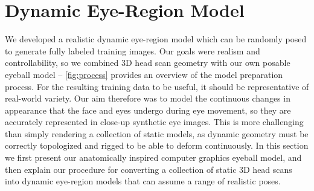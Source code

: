 


\section{Dynamic Eye-Region Model}

We developed a realistic dynamic eye-region model which can be randomly posed to generate fully labeled training images.
Our goals were realism and controllability, so we combined 3D head scan geometry with our own posable eyeball model -- \autoref{fig:process} provides an overview of the model preparation process.
For the resulting training data to be useful, it should be representative of real-world variety.
Our aim therefore was to model the continuous changes in appearance that the face and eyes undergo during eye movement, so they are accurately represented in close-up synthetic eye images.
This is more challenging than simply rendering a collection of static models, as dynamic geometry must be correctly topologized and rigged to be able to deform continuously.
%
In this section we first present our anatomically inspired computer graphics eyeball model, and then explain our procedure for converting a collection of static 3D head scans into dynamic eye-region models that can assume a range of realistic poses.


